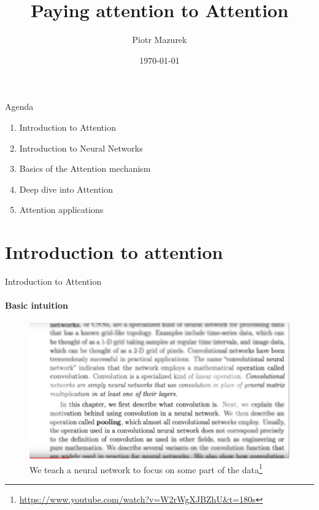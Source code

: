 \documentclass{beamer}
\title{Paying attention to Attention}
\author{Piotr Mazurek}
\date{\today}
\begin{document}
\maketitle



\begin{frame}{Agenda}
\begin{enumerate}


\item Introduction to Attention 

\item Introduction to Neural Networks

\item Basics of the Attention mechanism

\item Deep dive into Attention

\item Attention applications
 
\end{enumerate}
\end{frame}



\section{Introduction to attention}
\begin{frame}{Introduction to Attention}
\framesubtitle{Basic intuition}

\begin{figure}
    \includegraphics[width = .8\textwidth]{images/attention-intuition.png}
    \caption{We teach a neural network to focus on some part of the data\footnote{\url{https://www.youtube.com/watch?v=W2rWgXJBZhU&t=180s}}}
\end{figure}{}

\end{frame}
\end{document}
